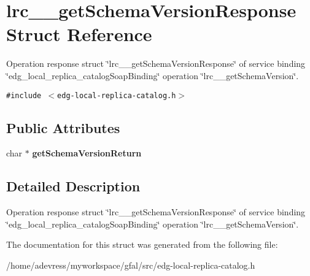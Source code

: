 \section{lrc\_\-\_\-get\-Schema\-Version\-Response Struct Reference}
\label{structlrc____getSchemaVersionResponse}
Operation response struct \char`\"{}lrc\_\-\_\-get\-Schema\-Version\-Response\char`\"{} of service binding \char`\"{}edg\_\-local\_\-replica\_\-catalog\-Soap\-Binding\char`\"{} operation \char`\"{}lrc\_\-\_\-get\-Schema\-Version\char`\"{}.  


{\tt \#include $<$edg-local-replica-catalog.h$>$}

\subsection*{Public Attributes}
\begin{CompactItemize}
\item 
char $\ast$ \textbf{get\-Schema\-Version\-Return}\label{structlrc____getSchemaVersionResponse_f1f1b30e593176a1d6cc45a918060782}

\end{CompactItemize}


\subsection{Detailed Description}
Operation response struct \char`\"{}lrc\_\-\_\-get\-Schema\-Version\-Response\char`\"{} of service binding \char`\"{}edg\_\-local\_\-replica\_\-catalog\-Soap\-Binding\char`\"{} operation \char`\"{}lrc\_\-\_\-get\-Schema\-Version\char`\"{}. 



The documentation for this struct was generated from the following file:\begin{CompactItemize}
\item 
/home/adevress/myworkspace/gfal/src/edg-local-replica-catalog.h\end{CompactItemize}

